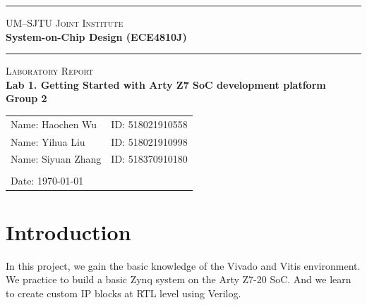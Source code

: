 \documentclass[a4paper]{article}
\begin{document}
\begin{titlepage}
    \vspace*{0.25cm}
    \noindent\rule[0.25\baselineskip]{\textwidth}{1pt}
    \begin{center}
        \huge{\textsc{UM--SJTU Joint Institute}}\vspace{0.3em}\\
        \huge{\textbf{System-on-Chip Design (ECE4810J)}}\vspace{0.3em}\\
        \noindent\rule[0.25\baselineskip]{\textwidth}{1pt}
    \end{center}
    \begin{center}
        \vspace{5cm}
        \Large{\textsc{Laboratory Report}}\vspace{0.5em}\\
        \Large{\textbf{Lab 1. Getting Started with Arty Z7 SoC development platform}}\vspace{1em}\\
        \Large{\textbf{Group 2}}\\
    \end{center}
    \vfill
    \large
    \begin{tabular}{ll}
        Name: Haochen Wu \hspace*{2em}&ID: 518021910558\hspace*{2em}\\
        Name: Yihua Liu \hspace*{2em}&ID: 518021910998\hspace*{2em}\\
        Name: Siyuan Zhang \hspace*{2em}&ID:
        518370910180 \hspace*{2em}\\
        \\
        Date: \today
    \end{tabular}
\end{titlepage}
\tableofcontents
\newpage
\section{Introduction}
In this project, we gain the basic knowledge of the Vivado and Vitis environment. We practice to build a basic Zynq system on the Arty Z7-20 SoC. And we learn to create custom IP blocks at RTL level using Verilog.
\end{document}
